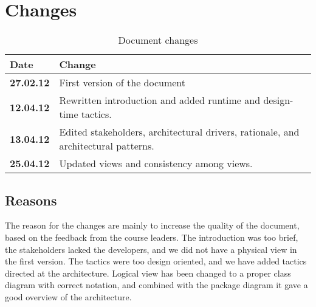\pagebreak

\section{Changes}

\begin{table}[h!]
\begin{tabular}{ | p{90pt} | p{270pt}  |}
\hline
\bf Date & \bf Change \\ \hline
\bf 27.02.12  &  First version of the document  \\ \hline
\bf 12.04.12  &  Rewritten introduction and added runtime and design-time tactics.  \\ \hline
\bf 13.04.12  &  Edited stakeholders, architectural drivers, rationale, and architectural patterns.  \\ \hline
\bf 25.04.12  &  Updated views and consistency among views.  \\ \hline
\end{tabular}
\caption{Document changes}
\end{table}

\subsection{Reasons}
The reason for the changes are mainly to increase the quality of the document, based on the feedback from the course leaders. The introduction was too brief, the stakeholders lacked the developers, and we did not have a physical view in the first version. The tactics were too design oriented, and we have added tactics directed at the architecture. Logical view has been changed to a proper class diagram with correct notation, and combined with the package diagram it gave a good overview of the architecture.




